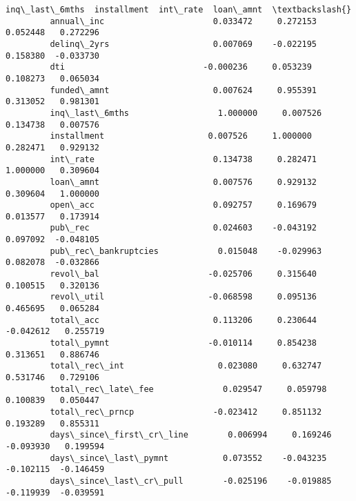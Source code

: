 \documentclass[10pt,notitlepage,onecolumn,aps,pra]{revtex4-1}
\begin{document}
\begin{Verbatim}[commandchars=\\\{\}]
                                   inq\_last\_6mths  installment  int\_rate  loan\_amnt  \textbackslash{}
         annual\_inc                      0.033472     0.272153  0.052448   0.272296   
         delinq\_2yrs                     0.007069    -0.022195  0.158380  -0.033730   
         dti                            -0.000236     0.053239  0.108273   0.065034   
         funded\_amnt                     0.007624     0.955391  0.313052   0.981301   
         inq\_last\_6mths                  1.000000     0.007526  0.134738   0.007576   
         installment                     0.007526     1.000000  0.282471   0.929132   
         int\_rate                        0.134738     0.282471  1.000000   0.309604   
         loan\_amnt                       0.007576     0.929132  0.309604   1.000000   
         open\_acc                        0.092757     0.169679  0.013577   0.173914   
         pub\_rec                         0.024603    -0.043192  0.097092  -0.048105   
         pub\_rec\_bankruptcies            0.015048    -0.029963  0.082078  -0.032866   
         revol\_bal                      -0.025706     0.315640  0.100515   0.320136   
         revol\_util                     -0.068598     0.095136  0.465695   0.065284   
         total\_acc                       0.113206     0.230644 -0.042612   0.255719   
         total\_pymnt                    -0.010114     0.854238  0.313651   0.886746   
         total\_rec\_int                   0.023080     0.632747  0.531746   0.729106   
         total\_rec\_late\_fee              0.029547     0.059798  0.100839   0.050447   
         total\_rec\_prncp                -0.023412     0.851132  0.193289   0.855311   
         days\_since\_first\_cr\_line        0.006994     0.169246 -0.093930   0.199594   
         days\_since\_last\_pymnt           0.073552    -0.043235 -0.102115  -0.146459   
         days\_since\_last\_cr\_pull        -0.025196    -0.019885 -0.119939  -0.039591   
         

\end{Verbatim}
\end{document}
